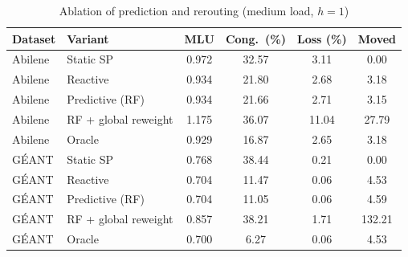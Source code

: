 \begin{table}[t]
\centering
\caption{Ablation of prediction and rerouting (medium load, $h=1$)}
\label{tab:abl_route}
\scriptsize\setlength{\tabcolsep}{2.5pt}
\begin{tabular}{@{}llcccc@{}}
\toprule
Dataset & Variant & MLU & Cong.\ (\%) & Loss (\%) & Moved \\
\midrule
Abilene & Static SP & 0.972 & 32.57 & 3.11 & 0.00 \\
Abilene & Reactive & 0.934 & 21.80 & 2.68 & 3.18 \\
Abilene & Predictive (RF) & 0.934 & 21.66 & 2.71 & 3.15 \\
Abilene & RF + global reweight & 1.175 & 36.07 & 11.04 & 27.79 \\
Abilene & Oracle & 0.929 & 16.87 & 2.65 & 3.18 \\
G\'EANT & Static SP & 0.768 & 38.44 & 0.21 & 0.00 \\
G\'EANT & Reactive & 0.704 & 11.47 & 0.06 & 4.53 \\
G\'EANT & Predictive (RF) & 0.704 & 11.05 & 0.06 & 4.59 \\
G\'EANT & RF + global reweight & 0.857 & 38.21 & 1.71 & 132.21 \\
G\'EANT & Oracle & 0.700 & 6.27 & 0.06 & 4.53 \\
\bottomrule
\end{tabular}
\end{table}
